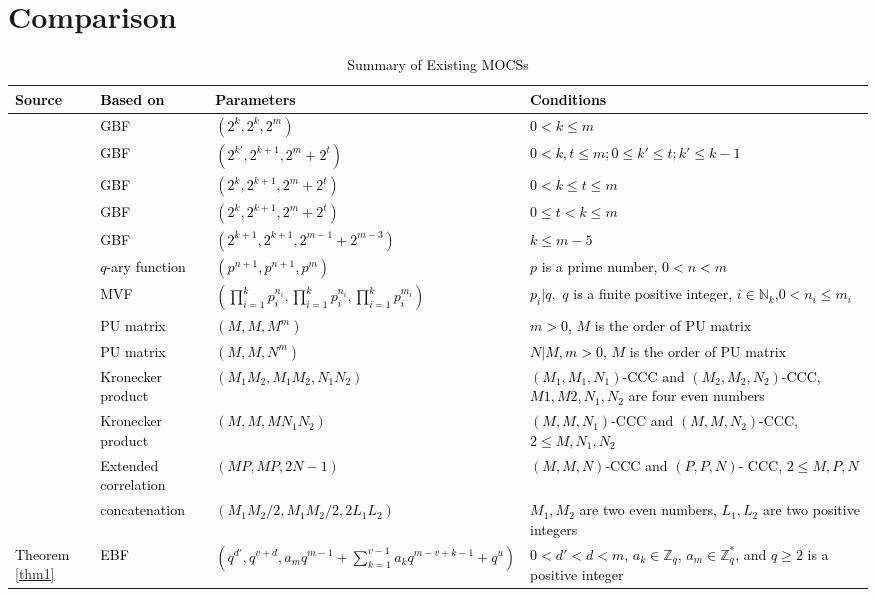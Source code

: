 \documentclass[11pt]{article}
\newcommand{\2} {$2$-to-$1$}
\begin{document}
\section{Comparison}
\textcolor{black}{\begin{table}
		\centering
		\setlength{\abovecaptionskip}{0cm}
		\setlength{\belowcaptionskip}{0.2cm}
		\caption{Summary of Existing MOCSs}
		\tiny
		\begin{tabular}{|m{1cm}<{\centering}|m{2cm}<{\centering}|m{5.8cm}<{\centering}|m{5.2cm}<{\centering}|}
			\hline Source&Based on&Parameters&Conditions\\
			\hline \cite{AR}&GBF&$(2^k,2^k,2^m)$&$0<k\leq m$\\
			\hline \cite{SW}&GBF&$(2^{k'},2^{k+1},2^m+2^t)$&$0<k,t\leq m;0\leq {k'}\leq t; {k'}\leq {k-1}$\\
			\hline \cite{SW}&GBF&$(2^k,2^{k+1},2^m+2^t)$&$0<k\leq t\leq m$\\
			\hline \cite{LT}&GBF&$(2^k,2^{k+1},2^m+2^t)$&$0\leq t<k\leq m$\\
			\hline\cite{KM}&GBF&$(2^{k+1},2^{k+1},2^{m-1}+2^{m-3})$&$k\leq m-5$\\
		\hline\cite{SP5}&$q$-ary function&$(p^{n+1},p^{n+1},p^{m})$&$p$  is a prime number, $0<n<m$\\
			\hline \cite{PS2}&MVF&$(\prod^{k}_{i=1}p_{i}^{n_i},\prod^{k}_{i=1}p_{i}^{n_i},\prod^{k}_{i=1}p_{i}^{m_{i}})$&$p_{i}|q,$ $q$ is a finite positive integer, $i\in \mathbb{N}_k$,$0<n_i\leq m_i$\\
			\hline \cite{SD1}&PU matrix&$(M,M,M^m)$&$m>0$, $M$ is the order of  PU matrix\\
			\hline \cite{SD2}&PU matrix&$(M,M,N^m)$&$N|M,m>0$, $M$ is the order of  PU matrix\\
			\hline \cite{YJ}&Kronecker product&$(M_{1}M_{2},M_{1}M_{2},N_{1}N_{2})$&$(M_1,M_1,N_1)$-CCC  and $ (M_2,M_2,N_2)$-CCC, $M1, M2,N_1,N_2$ are four even numbers\\
			\hline \cite{ZG}&Kronecker product&$(M,M,MN_1N_2)$&$(M,M,N_1)$-CCC  and $ (M,M,N_2)$-CCC, $2\leq M,N_1,N_2$\\
		\hline \cite{KL}&Extended correlation&$(MP,MP,2N-1)$&$(M,M,N)$-CCC and $  (P, P, N)$-
			CCC,  $2\leq M,P,N$\\
\hline \cite{SB}&concatenation&$(M_1M_2/2,M_1M_2/2, 2L_1 L_2)$&$M_1, M_2$ are two even numbers, $ L_1,L_2$ are two positive integers\\
			\hline Theorem \ref{thm1}&EBF&$(q^{d'},q^{v+d},a_mq^{m-1}+\sum^{v-1}_{k=1}a_{k}q^{m-v+k-1}+q^{u} )$&$0<d'<d< m$, $ a_{k}\in \mathbb{Z}_q$, $a_m\in \mathbb{Z}^*_q$, and $q\geq 2$ is a  positive integer\\
			\hline
		\end{tabular}
\end{table}}
\end{document}
